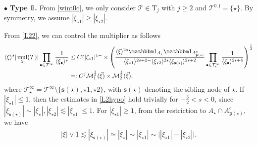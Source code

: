 \documentclass[a4paper,
11pt,  reqno]{amsart}
\newcommand{\II}{\textup{I \hspace{-2.9mm} I} }
\newcommand{\5}{\textup{V}}
\newcommand{\noi}{\noindent}
\newcommand{\ind}{\mathbbm 1}
\newcommand{\les}{\lesssim}
\theoremstyle{remark}
\newcommand{\bul}{\bullet}
\newcommand{\TT}{\mathcal{T}}
\newcommand{\Tr}{\mathrm{T}}
\newcommand{\pb}{\mathbf{p}}
\newcommand{\sbf}{\mathbf{s}}
\newcommand{\jb}[1]
{\langle #1 \rangle}
\newcommand{\ff}{\mathfrak{f}}
\newcommand{\M}{\mathcal{M}}
\DeclareMathOperator{\mul}{mul}
\numberwithin{equation}{section}
\numberwithin{theorem}{section}
\begin{document}
\noi
$\bul$ \textbf{Type $\II$.}
From \eqref{wint0c}, we only consider $\TT\in \Tr_j$ with $j\ge 2$ and $\TT^{0,\ff} = \{\star\}$. By symmetry, we assume $|\xi_{\star1}| \ge |\xi_{\star2}|$. 
{
From \eqref{L22}, we can control the multiplier as follows
\begin{align}\label{L22_1}
\jb{\xi}^s |\mul_2(\TT)|  \prod_{\bul \in \TT^\infty} \frac{1}{\jb{\xi_\bul}^s}
&
\le 
C^j
|\xi_{\star1}|^{1-}
\times 
\left(\frac{\jb{\xi}^{2s} \ind_{A_\star} \ind_{A^c_{\pb(\star)}} }{ \jb{\xi_{\star1}}^{2s+2-} \jb{\xi_{\star2}}^{2s}  \jb{\xi_{\sbf(\star)}}^{2s+2} } \prod_{\bul \in \TT^{\infty}_\star} \frac{1}{\jb{\xi_{\bul}}^{2s+4}}\right)^{\frac12}
\\
&
=:
C^j 
\mathcal{M}_1^{\frac12} (\vec\xi)
\times 
\M_2^\frac12 (\vec\xi)
, 
\end{align}
where $\TT^\infty_\star = \TT^\infty \setminus \{\sbf(\star), \star1, \star2\}$, with $\sbf(\star)$ denoting the sibling node of $\star$. If $|\xi_{\star1}| \le 1$, then the estimates in \eqref{L2hypo} hold trivially for $-\frac32<s<0$, since $|\xi_{\sbf(\star)}| \sim |\xi_{\star}| , |\xi_{\star2}| \les |\xi_{\star1}| \le 1 $. For $|\xi_{\star1}| \ge 1$, from the restriction to $A_\star \cap A_{\pb(\star)}^c$, we have
\begin{align}
|\xi| \lor 1 
 \les   |\xi_{\sbf(\star)}| \simeq |\xi_{\star}|
\sim 
|\xi_{\star1}| 
\sim 
\big| |\xi_{\star1} | - |\xi_{\star2}| \big| 
.
\end{align}





}
\end{document}
